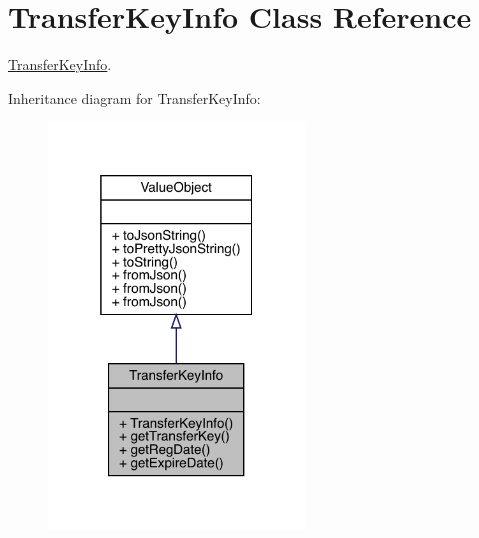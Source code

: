 \hypertarget{classcom_1_1toast_1_1android_1_1gamebase_1_1auth_1_1data_1_1_transfer_key_info}{}\section{Transfer\+Key\+Info Class Reference}
\label{classcom_1_1toast_1_1android_1_1gamebase_1_1auth_1_1data_1_1_transfer_key_info}


\hyperlink{classcom_1_1toast_1_1android_1_1gamebase_1_1auth_1_1data_1_1_transfer_key_info}{Transfer\+Key\+Info}.  




Inheritance diagram for Transfer\+Key\+Info\+:\nopagebreak
\begin{figure}[H]
\begin{center}
\leavevmode
\includegraphics[width=193pt]{classcom_1_1toast_1_1android_1_1gamebase_1_1auth_1_1data_1_1_transfer_key_info__inherit__graph}
\end{center}
\end{figure}


